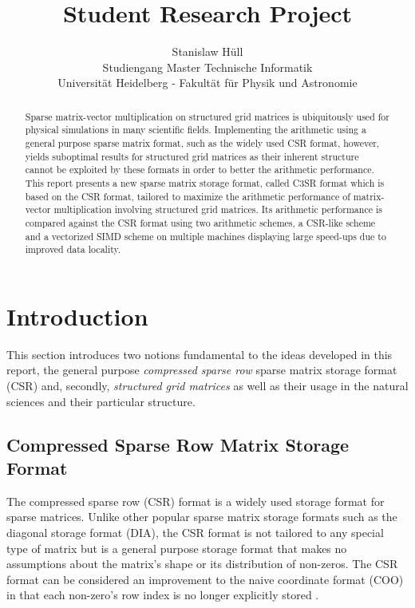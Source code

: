 \documentclass{article}
\author{Stanislaw Hüll\\\small{Studiengang Master Technische Informatik}\\\small{Universität Heidelberg - Fakultät für Physik und Astronomie}}
\title{Student Research Project}
\begin{document}
\maketitle

\begin{abstract}
Sparse matrix-vector multiplication on structured grid matrices is ubiquitously used for physical simulations in many scientific fields. Implementing the arithmetic using a general purpose sparse matrix format, such as the widely used CSR format, however, yields suboptimal results for structured grid matrices as their inherent structure cannot be exploited by these formats in order to better the arithmetic performance. This report presents a new sparse matrix storage format, called C3SR format which is based on the CSR format, tailored to maximize the arithmetic performance of matrix-vector multiplication involving structured grid matrices. Its arithmetic performance is compared against the CSR format using two arithmetic schemes, a CSR-like scheme and a vectorized SIMD scheme on multiple machines displaying large speed-ups due to improved data locality.
\end{abstract}

\newpage
\tableofcontents
\newpage
\listoffigures
\newpage
\section{Introduction}

  This section introduces two notions fundamental to the ideas developed in this report, the general purpose \emph{compressed sparse row} sparse matrix storage format (CSR) and, secondly, \emph{structured grid matrices} as well as their usage in the natural sciences and their particular structure.

  \subsection{Compressed Sparse Row Matrix Storage Format}

    The compressed sparse row (CSR) format is a widely used storage format for sparse matrices. Unlike other popular sparse matrix storage formats such as the diagonal storage format (DIA), the CSR format is not tailored to any special type of matrix but is a general purpose storage format that makes no assumptions about the matrix's shape or its distribution of non-zeros. The CSR format can be considered an improvement to the naive coordinate format (COO) in that each non-zero's row index is no longer explicitly stored \cite{Bell2011}.
\end{document}
